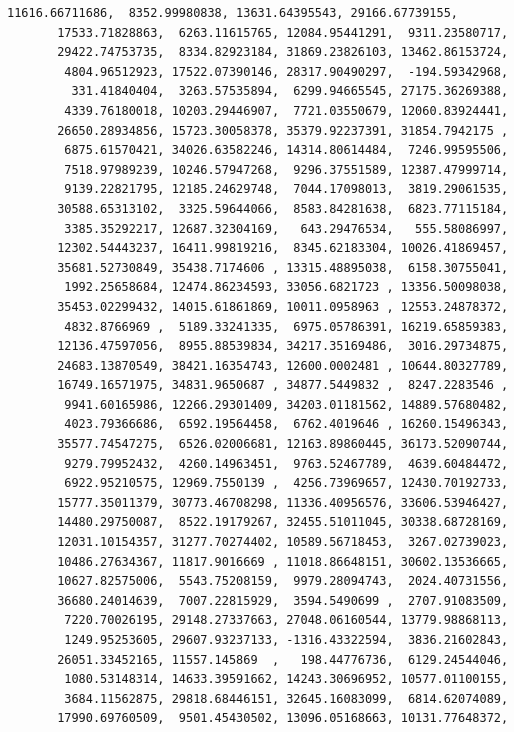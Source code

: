 \documentclass[11pt]{article}
\begin{document}
\begin{tcolorbox}[breakable, size=fbox, boxrule=.5pt, pad at break*=1mm, opacityfill=0]
\begin{Verbatim}[commandchars=\\\{\}]
       11616.66711686,  8352.99980838, 13631.64395543, 29166.67739155,
       17533.71828863,  6263.11615765, 12084.95441291,  9311.23580717,
       29422.74753735,  8334.82923184, 31869.23826103, 13462.86153724,
        4804.96512923, 17522.07390146, 28317.90490297,  -194.59342968,
         331.41840404,  3263.57535894,  6299.94665545, 27175.36269388,
        4339.76180018, 10203.29446907,  7721.03550679, 12060.83924441,
       26650.28934856, 15723.30058378, 35379.92237391, 31854.7942175 ,
        6875.61570421, 34026.63582246, 14314.80614484,  7246.99595506,
        7518.97989239, 10246.57947268,  9296.37551589, 12387.47999714,
        9139.22821795, 12185.24629748,  7044.17098013,  3819.29061535,
       30588.65313102,  3325.59644066,  8583.84281638,  6823.77115184,
        3385.35292217, 12687.32304169,   643.29476534,   555.58086997,
       12302.54443237, 16411.99819216,  8345.62183304, 10026.41869457,
       35681.52730849, 35438.7174606 , 13315.48895038,  6158.30755041,
        1992.25658684, 12474.86234593, 33056.6821723 , 13356.50098038,
       35453.02299432, 14015.61861869, 10011.0958963 , 12553.24878372,
        4832.8766969 ,  5189.33241335,  6975.05786391, 16219.65859383,
       12136.47597056,  8955.88539834, 34217.35169486,  3016.29734875,
       24683.13870549, 38421.16354743, 12600.0002481 , 10644.80327789,
       16749.16571975, 34831.9650687 , 34877.5449832 ,  8247.2283546 ,
        9941.60165986, 12266.29301409, 34203.01181562, 14889.57680482,
        4023.79366686,  6592.19564458,  6762.4019646 , 16260.15496343,
       35577.74547275,  6526.02006681, 12163.89860445, 36173.52090744,
        9279.79952432,  4260.14963451,  9763.52467789,  4639.60484472,
        6922.95210575, 12969.7550139 ,  4256.73969657, 12430.70192733,
       15777.35011379, 30773.46708298, 11336.40956576, 33606.53946427,
       14480.29750087,  8522.19179267, 32455.51011045, 30338.68728169,
       12031.10154357, 31277.70274402, 10589.56718453,  3267.02739023,
       10486.27634367, 11817.9016669 , 11018.86648151, 30602.13536665,
       10627.82575006,  5543.75208159,  9979.28094743,  2024.40731556,
       36680.24014639,  7007.22815929,  3594.5490699 ,  2707.91083509,
        7220.70026195, 29148.27337663, 27048.06160544, 13779.98868113,
        1249.95253605, 29607.93237133, -1316.43322594,  3836.21602843,
       26051.33452165, 11557.145869  ,   198.44776736,  6129.24544046,
        1080.53148314, 14633.39591662, 14243.30696952, 10577.01100155,
        3684.11562875, 29818.68446151, 32645.16083099,  6814.62074089,
       17990.69760509,  9501.45430502, 13096.05168663, 10131.77648372,

\end{Verbatim}
\end{tcolorbox}
\end{document}
